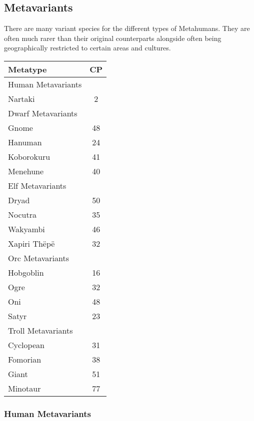 \begin{multicols*}{3}
	
	\subsection{Metavariants}
	
	There are many variant species for the different types of Metahumans. They are often much rarer than their original counterparts alongside often being geographically restricted to certain areas and cultures.
	
	\begin{center}
		\begin{tabularx}{0.32\textwidth}{|X|c|}
			\hline
			Metatype & CP \\
			\hline
			\hline
			Human Metavariants & \\
			\hline
			Nartaki & 2 \\
			\hline
			\hline
			Dwarf Metavariants & \\
			\hline
			Gnome & 48 \\
			Hanuman & 24 \\
			Koborokuru & 41 \\
			Menehune & 40 \\
			\hline
			\hline
			Elf Metavariants & \\
			\hline
			Dryad & 50 \\
			Nocutra & 35 \\
			Wakyambi & 46 \\
			Xapiri Thëpë & 32 \\
			\hline
			\hline
			Orc Metavariants & \\
			\hline
			Hobgoblin & 16 \\
			Ogre & 32 \\
			Oni & 48 \\
			Satyr & 23 \\
			\hline
			\hline
			Troll Metavariants & \\
			\hline
			Cyclopean & 31 \\
			Fomorian & 38 \\
			Giant & 51 \\
			Minotaur & 77 \\
			\hline
		\end{tabularx}
	\end{center}
	
	\subsubsection{Human Metavariants}
	

\end{multicols*}
